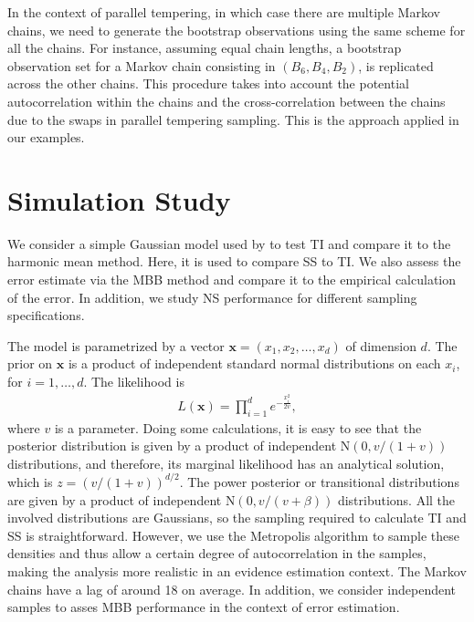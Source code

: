 \documentclass[aps,reprint,amsmath,amssymb,showpacs,showkeys]{revtex4-1}%
\begin{document}
In the context of parallel tempering, in which case there are multiple Markov chains, we need to generate the bootstrap observations using the same scheme for all the chains.  For instance, assuming equal chain lengths, a bootstrap observation set for a Markov chain consisting in $(B_6,B_4,B_2)$, is replicated across the other chains.  This procedure takes into account the potential autocorrelation within the chains and the cross-correlation between the chains due to the swaps in parallel tempering sampling.  This is the approach applied in our examples.

\section{Simulation Study} \label{sec:simulation}
We consider a simple Gaussian model used by \cite{Lartillot:Philippe:2006} to test TI and compare it to the harmonic mean method.  Here, it is used to compare SS to TI.  We also assess the error estimate via the MBB method and compare it to the empirical calculation of the error.  In addition, we study NS performance for different sampling specifications.  

The model is parametrized by a vector $\bm{x} = (x_1,x_2, \dots, x_d)$ of dimension $d$. The prior on $\bm x$ is a product of independent standard normal distributions on each $x_i$, for $i = 1, \dots,d$.  The likelihood is 
\begin{align*}
L(\bm{x}) = \prod_{i=1}^{d} e^{- \frac{x_i^2}{2v}},
\end{align*}
where $v$ is a parameter.  Doing some calculations, it is easy to see that the posterior distribution is given by a product of independent $\text{N}(0, v/(1+v))$ distributions, and therefore, its marginal likelihood has an analytical solution, which is $z = (v/(1+v))^{d/2}$.  The power posterior or transitional distributions are given by a product of independent  $\text{N}(0,v/(v+\beta))$ distributions.  All the involved distributions are Gaussians, so the sampling required to calculate TI and SS is straightforward.  However, we use the Metropolis algorithm to sample these densities and thus allow a certain degree of autocorrelation in the samples, making the analysis more realistic in an evidence estimation context.  The Markov chains have a lag of around 18 on average.  In addition, we consider independent samples to asses MBB performance in the context of error estimation.  
\end{document}
